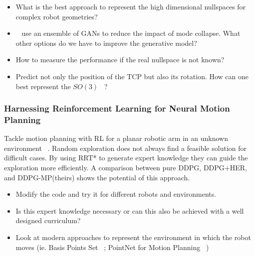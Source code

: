 \documentclass[a4paper]{article}
\begin{document}
\begin{itemize}
  \item What is the best approach to represent the high dimensional nullspaces for complex robot geometries?
  \item ~\cite{Lembono2021} use an ensemble of GANs to reduce the impact of mode collapse.
        What other options do we have to improve the generative model?
  \item How to measure the performance if the real nullspace is not known?
  \item Predict not only the position of the TCP but also its rotation.
        How can one best represent the $SO(3)$ ~\cite{Zhou2018}?
\end{itemize}

\subsubsection{Harnessing Reinforcement Learning for Neural Motion Planning}
Tackle motion planning with RL for a planar robotic arm in an unknown environment ~\cite{Jurgenson2019}.
Random exploration does not always find a feasible solution for difficult cases. 
By using RRT* to generate expert knowledge they can guide the exploration more efficiently.
A comparison between pure DDPG, DDPG+HER, and DDPG-MP(theirs) shows the potential of this approach.


\begin{itemize}
  \item Modify the code and try it for different robots and environments.
  \item Is this expert knowledge necessary or can this also be achieved with a well designed curriculum?
  \item Look at modern approaches to represent the environment in which the robot moves (ie. Basis Points Set ~\cite{Prokudin2019}; PointNet for Motion Planning ~\cite{Strudel2020})
\end{itemize}
\end{document}

